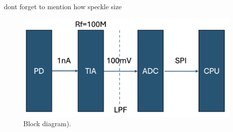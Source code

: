 dont forget to mention how speckle size
\cite{specklesize}


\begin{figure}[t]
  \centering
  \includegraphics[width=\widthnarrow]{figures/block_diagram.png}
  \caption{Block diagram).}
  \label{fig:something}
\end{figure}



